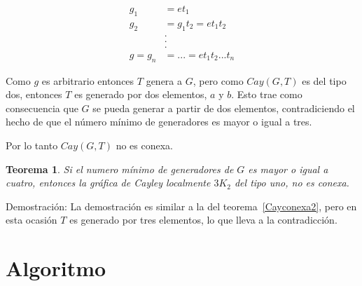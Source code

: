 \documentclass[11pt]{book}
\newtheorem{theorem}{Teorema}
\theoremstyle{definition}
\begin{document}
\begin{equation*}
  \begin{split}
    g_1&=et_1\\
    g_2&=g_1t_2=et_1t_2\\
    &  .\\
    &  .\\
    &  .\\
    g=g_n&=...=et_1t_2...t_n
  \end{split}
\end{equation*}

Como $g$ es arbitrario entonces $T$ genera a $G$, pero como $Cay(G,T)$
es del tipo dos, entonces $T$ es generado por dos elementos, $a$ y
$b$. Esto trae como consecuencia que $G$ se pueda generar a partir de
dos elementos, contradiciendo el hecho de que el número mínimo de
generadores es mayor o igual a tres.

Por lo tanto $Cay(G,T)$ no es conexa. 

\begin{theorem}\label{Cayconexa1}
  Si el numero mínimo de generadores de $G$ es mayor o igual a cuatro,
  entonces la gráfica de Cayley localmente $3K_2$ del tipo uno, no es
  conexa.
\end{theorem}

Demostración: La demostración es similar a la del
teorema~\ref{Cayconexa2}, pero en esta ocasión $T$ es generado por
tres elementos, lo que lleva a la contradicción.

\section{Algoritmo}
\end{document}
